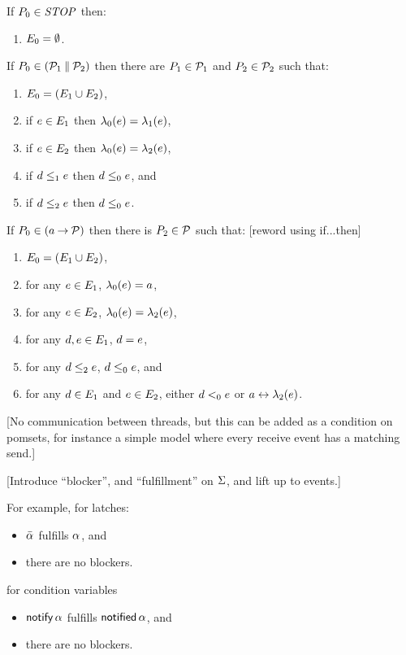 \begin{figure*}
  If $P_0\in\mathit{STOP}$ then:
  \begin{enumerate}
    \item $E_0 = \emptyset$.
  \end{enumerate}
  If $P_0 \in (\mathcal{P}_1\mathbin{\parallel}\mathcal{P}_2)$ then
  there are $P_1\in\mathcal{P}_1$ and $P_2\in\mathcal{P}_2$ such that:
  \begin{enumerate}
  \item $E_0 = (E_1\cup E_2)$,
  \item if $e\in E_1$ then $\lambda_0(e) = \lambda_1(e)$, 
  \item if $e\in E_2$ then $\lambda_0(e) = \lambda_2(e)$,
  \item if $d\le_1e$ then $d\le_0e$, and
  \item if $d\le_2e$ then $d\le_0e$.
    \setcounter{pomsetParCount}{\value{enumi}}
  \end{enumerate}
  If $P_0 \in (a\mathbin{\rightarrow}\mathcal{P})$ then there is $P_2\in\mathcal{P}$ such that: [reword using if...then]
  \begin{enumerate}
  \item $E_0=(E_1 \cup E_2)$,
  \item for any $e\in E_1$, $\lambda_0(e) = a$,
  \item for any $e\in E_2$, $\lambda_0(e) = \lambda_2(e)$,
  \item for any $d,e\in E_1$, $d=e$,
  \item for any $d\le_2e$, $d\le_0e$, and
  \item for any $d\in E_1$ and $e\in E_2$, either $d<_0e$ or $a\mathrel\leftrightarrow\lambda_2(e)$.
    \setcounter{pomsetPrefixCount}{\value{enumi}}
  \end{enumerate}
\caption{Process algebra as sets of pomsets}
\end{figure*}

[No communication between threads, but this can be added as a condition on pomsets,
  for instance a simple model where every receive event has a matching send.]

[Introduce ``blocker'', and ``fulfillment'' on $\Sigma$, and lift up to events.]

For example, for latches:
\begin{itemize}
\item $\bar{\alpha}_{}$ fulfills ${\alpha}_{}$, and
\item there are no blockers.
\end{itemize}
for condition variables
\begin{itemize}
\item $\mathsf{notify}\,\alpha{}$ fulfills $\mathsf{notified}\,\alpha{}$, and
\item there are no blockers.
\end{itemize}
  
